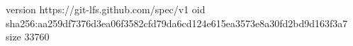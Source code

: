 version https://git-lfs.github.com/spec/v1
oid sha256:aa259df7376d3ea06f3582cfd79da6cd124e615ea3573e8a30fd2bd9d163f3a7
size 33760
